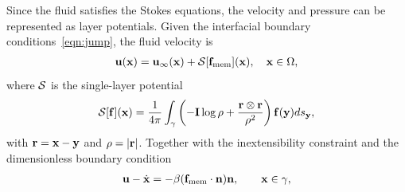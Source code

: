 \documentclass[prb,preprint,showpacs,preprintnumbers,amsmath,amssymb,longbibliography]{revtex4-1}
\begin{document}


Since the fluid satisfies the Stokes equations, the velocity and
pressure can be represented as layer potentials. Given the interfacial
boundary conditions~\eqref{eqn:jump}, the fluid velocity is
\begin{align}
  \mathbf{u}(\mathbf{x}) = \mathbf{u}_\infty(\mathbf{x}) + \mathcal{S}[\mathbf{f}_\mathrm{mem}](\mathbf{x}), \quad
    \mathbf{x} \in \Omega,
\end{align}
where $\mathcal{S}$ is the single-layer potential
\begin{align}
  \mathcal{S}[\mathbf{f}](\mathbf{x}) = \frac{1}{4\pi} \int_{\gamma} \left(
    -\mathbf{I} \log\rho + \frac{\mathbf{r} \otimes \mathbf{r}}{\rho^2} \right)
    \mathbf{f}(\mathbf{y}) ds_{\mathbf{y}},
\end{align}
with $\mathbf{r} = \mathbf{x} - \mathbf{y}$ and $\rho = |\mathbf{r}|$. 
Together with the inextensibility constraint and the dimensionless boundary condition
\begin{align}
  \label{eqn:vesicleFlux}
  \mathbf{u} - \dot{\mathbf{x}} = - \beta (\mathbf{f}_\mathrm{mem} \cdot \mathbf{n}) \mathbf{n}, \qquad
  \mathbf{x} \in \gamma,
\end{align}
%
\end{document}
